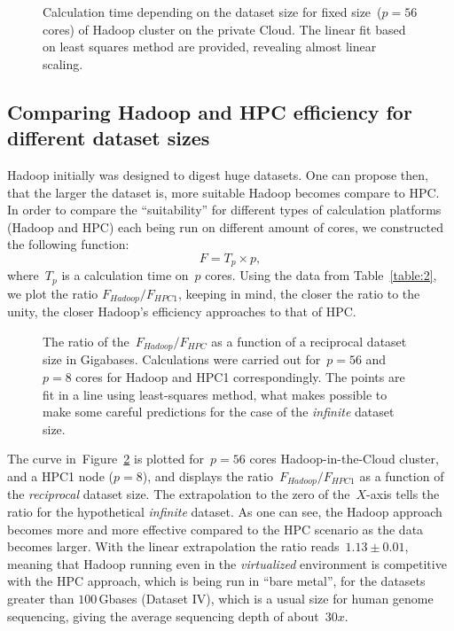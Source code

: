\documentclass[11pt, oneside]{article}   	%
\begin{document}
\begin{figure}
	
	\caption{Calculation time depending on the dataset size for fixed size~($p=56$ cores) of Hadoop cluster on the private Cloud. The linear fit based on least squares method are provided, revealing almost linear scaling.}
	\label{fig:fig1}
\end{figure}


\subsection{Comparing Hadoop and HPC efficiency for different dataset sizes}
Hadoop initially was designed to digest huge datasets\cite{hadoop,lin2010}. One can propose then,  that the larger the dataset is, more suitable Hadoop becomes compare to HPC. In order to compare the ``suitability'' for different types of calculation platforms (Hadoop and HPC) each being run on different amount of cores, we constructed the following function:
$$F=T_{p}\times p,$$ 
where~$T_{p}$ is a calculation time on~$p$ cores.
Using the data from Table~\ref{table:2},  we plot the ratio $F_{Hadoop}/F_{HPC1}$, keeping in mind, the closer the ratio to the unity, the closer Hadoop’s efficiency approaches to that of HPC.


\begin{figure}
	
	\caption{The ratio of the~$F_{Hadoop}/F_{HPC}$ as a function of a reciprocal dataset size in Gigabases.  Calculations were carried out for~$p=56$ and $p=8$ cores for Hadoop and HPC1 correspondingly.
The points are fit in a line using least-squares method, what makes  possible to make some careful predictions for the case of the {\it infinite} dataset size.}
	\label{fig:fig2}
\end{figure}


The curve  in~Figure~\ref{fig:fig2} is plotted for~$p=56$ cores Hadoop-in-the-Cloud cluster, and a HPC1 node ($p=8$), and displays the ratio~$F_{Hadoop}/F_{HPC1}$ as a function of the {\it reciprocal} dataset size. The extrapolation to the zero of the~$X$-axis tells the ratio for the hypothetical {\it infinite} dataset. As one can see, the Hadoop approach becomes more  and more effective compared to the HPC scenario as the data becomes larger. With  the linear extrapolation  the ratio reads~$1.13\pm0.01$, meaning that Hadoop running even  in the {\it virtualized} environment is competitive with  the HPC approach, which is being run in ``bare metal'', for the datasets greater than $100$\,Gbases (Dataset IV), which is a usual size for human genome sequencing, giving the average sequencing depth of  about~$30x$.
\end{document}
